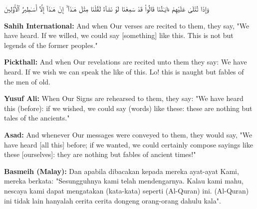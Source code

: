 \documentclass[11pt,a4paper,openany]{book}
\let\textAR\textarabic
\newcommand{\quranverse}[1]{{\centering\Large\textAR{#1}\par}}
\begin{document}
\begin{quranbox}[Qur'an 8:31]
\quranverse{وَإِذَا تُتْلَىٰ عَلَيْهِمْ ءَايَـٰتُنَا قَالُوا۟ قَدْ سَمِعْنَا لَوْ نَشَآءُ لَقُلْنَا مِثْلَ هَـٰذَآ ۙ إِنْ هَـٰذَآ إِلَّآ أَسَـٰطِيرُ ٱلْأَوَّلِينَ}

\vspace{6pt}
\noindent\textbf{Sahih International:} And when Our verses are recited to them, they say, "We have heard. If we willed, we could say [something] like this. This is not but legends of the former peoples."

\vspace{4pt}
\noindent\textbf{Pickthall:} And when Our revelations are recited unto them they say: We have heard. If we wish we can speak the like of this. Lo! this is naught but fables of the men of old.

\vspace{4pt}
\noindent\textbf{Yusuf Ali:} When Our Signs are rehearsed to them, they say: "We have heard this (before): if we wished, we could say (words) like these: these are nothing but tales of the ancients."

\vspace{4pt}
\noindent\textbf{Asad:} And whenever Our messages were conveyed to them, they would say, "We have heard [all this] before; if we wanted, we could certainly compose sayings like these [ourselves]: they are nothing but fables of ancient times!"

\vspace{4pt}
\noindent\textbf{Basmeih (Malay):} Dan apabila dibacakan kepada mereka ayat-ayat Kami, mereka berkata: "Sesungguhnya kami telah mendengarnya. Kalau kami mahu, nescaya kami dapat mengatakan (kata-kata) seperti (Al-Quran) ini. (Al-Quran) ini tidak lain hanyalah cerita cerita dongeng orang-orang dahulu kala".
\end{quranbox}
\end{document}
